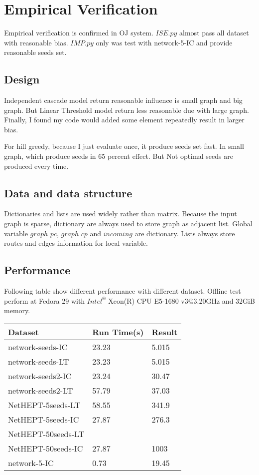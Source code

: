\documentclass[conference,compsoc]{IEEEtran}
\begin{document}
\section{Empirical Verification}
Empirical verification is confirmed in OJ system. $ISE.py$ almost pass all
dataset with reasonable bias. $IMP.py$ only was test with network-5-IC and
provide reasonable seeds set.

\subsection{Design}
Independent cascade model return reasonable influence is small graph and big graph.
But Linear Threshold model return less reasonable due with large graph. Finally,
I found my code would added some element repeatedly result in larger bias.

For hill greedy, because I just evaluate once, it produce seeds set fast. In
small graph, which produce seeds in 65 percent effect. But
Not optimal seeds are produced every time.

\subsection{Data and data structure}
Dictionaries and lists are used widely rather than matrix. Because the input graph
is sparse, dictionary are always used to store graph as adjacent list. Global
variable $graph\_pc$, $graph\_cp$ and $incoming$ are dictionary. Lists always
store routes and edges information for local variable.

\subsection{Performance}
Following table show different performance with different dataset. Offline
test perform at Fedora 29 with $Intel^{®}$ Xeon(R) CPU E5-1680 v3@3.20GHz and
32GiB memory.

\begin{center}
   \begin{tabular}{| l | l | l |}
   \hline
    Dataset             &Run Time(s)   &Result   \\ \hline
    network-seeds-IC     & 23.23        & 5.015  \\
    network-seeds-LT     & 23.23        & 5.015  \\
    network-seeds2-IC    & 23.24        & 30.47  \\ 
    network-seeds2-LT    & 57.79        & 37.03  \\
    NetHEPT-5seeds-LT    & 58.55        & 341.9  \\
    NetHEPT-5seeds-IC    & 27.87        & 276.3  \\
    NetHEPT-50seeds-LT    &         &   \\
    NetHEPT-50seeds-IC    & 27.87        & 1003  \\
    network-5-IC         & 0.73         & 19.45  \\
   \hline
   \end{tabular}
\end{center}
\end{document}
